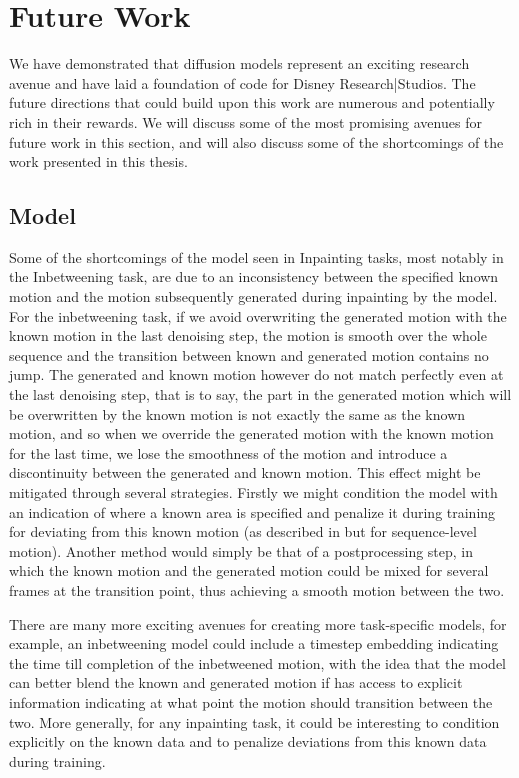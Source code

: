 \section{Future Work}
\label{sec:diffusion_future_work}

We have demonstrated that diffusion models represent an exciting research avenue and have laid a foundation of code for Disney Research|Studios. The future directions that could build upon this work are numerous and potentially rich in their rewards. We will discuss some of the most promising avenues for future work in this section, and will also discuss some of the shortcomings of the work presented in this thesis.

\subsection{Model}
Some of the shortcomings of the model seen in Inpainting tasks, most notably in the Inbetweening task, are due to an inconsistency between the specified known motion and the motion subsequently generated during inpainting by the model. For the inbetweening task, if we avoid overwriting the generated motion with the known motion in the last denoising step, the motion is smooth over the whole sequence and the transition between known and generated motion contains no jump. The generated and known motion however do not match perfectly even at the last denoising step, that is to say, the part in the generated motion which will be overwritten by the known motion is not exactly the same as the known motion, and so when we override the generated motion with the known motion for the last time, we lose the smoothness of the motion and introduce a discontinuity between the generated and known motion. This effect might be mitigated through several strategies. Firstly we might condition the model with an indication of where a known area is specified and penalize it during training for deviating from this known motion (as described in  but for sequence-level motion). Another method would simply be that of a postprocessing step, in which the known motion and the generated motion could be mixed for several frames at the transition point, thus achieving a smooth motion between the two.

There are many more exciting avenues for creating more task-specific models, for example, an inbetweening model could include a timestep embedding indicating the time till completion of the inbetweened motion, with the idea that the model can better blend the known and generated motion if has access to explicit information indicating at what point the motion should transition between the two. More generally, for any inpainting task, it could be interesting to condition explicitly on the known data and to penalize deviations from this known data during training.

